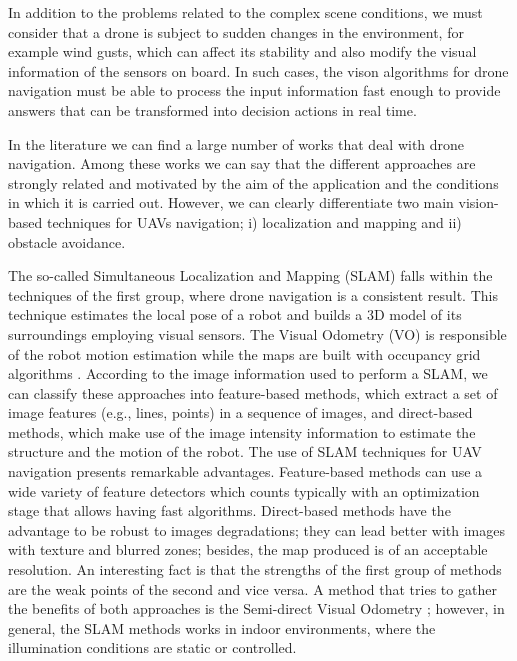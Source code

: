 In addition to the problems related to the complex scene conditions, we must consider that a drone is subject to sudden changes in the environment, for example wind gusts, which can affect its stability and also modify the visual information of the sensors on board. In such cases, the vison algorithms for drone navigation must be able to process the input information fast enough to provide answers that can be transformed into decision actions in real time.

In the literature we can find a large number of works that deal with drone navigation. Among these works we can say that the different approaches are strongly related and motivated by the aim of the application and the conditions in which it is carried out. However, we can clearly differentiate two main vision-based techniques for UAVs navigation; i) localization and mapping and ii) obstacle avoidance.

The so-called Simultaneous Localization and Mapping (SLAM) falls within the techniques of the first group, where drone navigation is a consistent result. This technique estimates the local pose of a robot and builds a 3D model of its surroundings employing visual sensors. The Visual Odometry (VO) \citep{Scaramuzza.Fraundorfer:RAM:2011} is responsible of the robot motion estimation while the maps are built with occupancy grid algorithms \citep{Thrun.Bu:AI:1996}. According to the image information used to perform a SLAM, we can classify these approaches into feature-based methods, which extract a set of image features (e.g., lines, points) in a sequence of images, and direct-based methods, which make use of the image intensity information to estimate the structure and the motion of the robot.
The use of SLAM techniques for UAV navigation presents remarkable advantages. Feature-based methods can use a wide variety of feature detectors which counts typically with an optimization stage that allows having fast algorithms. Direct-based methods have the advantage to be robust to images degradations; they can lead better with images with texture and blurred zones; besides, the map produced is of an acceptable resolution. An interesting fact is that the strengths of the first group of methods are the weak points of the second and vice versa. A method that tries to gather the benefits of both approaches is the Semi-direct Visual Odometry \citep{Forster.Pizzoli.ea:ICRA:2014}; however, in general, the SLAM methods works in indoor environments, where the illumination conditions are static or controlled.

